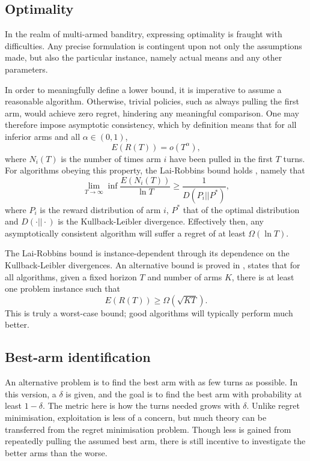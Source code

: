 \subsection{Optimality}
In the realm of multi-armed banditry, expressing optimality is fraught with difficulties.
Any precise formulation is contingent upon not only the assumptions made, but also the particular instance, namely actual means and any other parameters.

In order to meaningfully define a lower bound, it is imperative to assume a reasonable algorithm.
Otherwise, trivial policies, such as always pulling the first arm, would achieve zero regret, hindering any meaningful comparison.
One may therefore impose asymptotic consistency, which by definition means that for all inferior arms and all $\alpha \in (0, 1)$,
\begin{equation}
    E(R(T)) = o(T^{\alpha}),
\end{equation}
where $N_i(T)$ is the number of times arm $i$ have been pulled in the first $T$ turns.
For algorithms obeying this property, the Lai-Robbins bound holds \cite{lai1985}, namely that
\begin{equation}
    \lim_{T\to\infty} \inf \frac{E(N_i(T))}{\ln T} \geq \frac{1}{D(P_i || P^*)},
\end{equation}
where $P_i$ is the reward distribution of arm $i$, $P^*$ that of the optimal distribution and $D(\cdot || \cdot)$ is the Kullback-Leibler divergence.
Effectively then, any asymptotically consistent algorithm will suffer a regret of at least $\Omega(\ln T)$.

The Lai-Robbins bound is instance-dependent through its dependence on the Kullback-Leibler divergences.
An alternative bound is proved in \cite{slivkins2019}, states that for all algorithms, given a fixed horizon $T$ and number of arms $K$, there is at least one problem instance such that
\begin{equation}
    E(R(T)) \geq \Omega(\sqrt{KT}).
\end{equation}
This is truly a worst-case bound; good algorithms will typically perform much better.


\subsection{Best-arm identification}
An alternative problem is to find the best arm with as few turns as possible.
In this version, a $\delta$ is given, and the goal is to find the best arm with probability at least $1-\delta$.
The metric here is how the turns needed grows with $\delta$.
Unlike regret minimisation, exploitation is less of a concern, but much theory can be transferred from the regret minimisation problem.
Though less is gained from repeatedly pulling the assumed best arm, there is still incentive to investigate the better arms than the worse.

